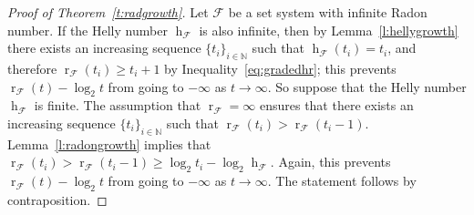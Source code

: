 \documentclass[11pt]{article}
\newcommand{\N}{\mathbb{N}}
\newcommand{\F}{\mathcal{F}}
\DeclareMathOperator{\h}{h}
\DeclareMathOperator{\rad}{r}
\begin{document}
%
\begin{proof}[Proof of Theorem~\ref{t:radgrowth}]
  Let $\F$ be a set system with infinite Radon number. If the Helly number $\h_\F$ is also infinite, then by Lemma~\ref{l:hellygrowth} there exists an increasing sequence $\{t_i\}_{i \in \N}$ such that $\h_\F(t_i) = t_i$, and therefore $\rad_\F(t_i) \ge t_i+1$ by Inequality~\eqref{eq:gradedhr}; this prevents $\rad_\F(t)-\log_2 t$ from going to $-\infty$ as $t \to \infty$. So suppose that the Helly number $\h_\F$ is finite. The assumption that $\rad_\F=\infty$ ensures that there exists an increasing sequence $\{t_i\}_{i \in \N}$ such that $\rad_\F(t_i) > \rad_\F(t_i-1)$. Lemma~\ref{l:radongrowth} implies that $\rad_\F(t_i) > \rad_\F(t_i-1) \ge \log_2 t_i - \log_2 \h_\F$. Again, this prevents $\rad_\F(t)-\log_2 t$ from going to $-\infty$ as $t \to \infty$. The statement follows by contraposition.
\end{proof}
%
%
\end{document}
